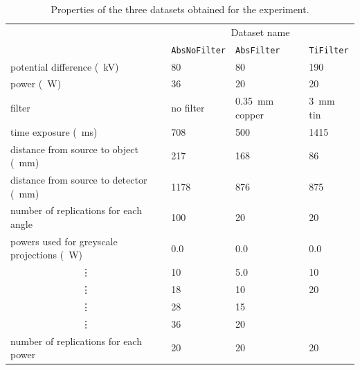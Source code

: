 \begin{table}
\centering
\begin{tabular}{l|lll}
                                                       & \multicolumn{3}{c}{Dataset name}                                                \\
                                                       & \texttt{AbsNoFilter} & \texttt{AbsFilter}             & \texttt{TiFilter}        \\ \hline
potential difference (\SI{}{\kilo\volt})               & 80                   & 80                             & 190                      \\
power (\SI{}{\watt})                                   & 36                   & 20                             & 20                       \\
filter                                                 & no filter            & \SI{0.35}{\milli\metre} copper & \SI{3}{\milli\metre} tin \\
time exposure (\SI{}{\milli\second})                   & 708                  & 500                            & 1415                     \\
distance from source to object (\SI{}{\milli\metre})   & 217                  & 168                            & 86                       \\
distance from source to detector (\SI{}{\milli\metre}) & 1178                 & 876                            & 875                      \\
number of replications for each angle                  & 100                  & 20                             & 20                       \\ \hline
powers used for greyscale projections (\SI{}{\watt})   & 0.0                  & 0.0                            & 0.0                      \\
\multicolumn{1}{c|}{\vdots}                            & 10                   & 5.0                            & 10                       \\
\multicolumn{1}{c|}{\vdots}                            & 18                   & 10                             & 20                       \\
\multicolumn{1}{c|}{\vdots}                            & 28                   & 15                             &                          \\
\multicolumn{1}{c|}{\vdots}                            & 36                   & 20                             &                          \\
number of replications for each power                  & 20                   & 20                             & 20                    
\end{tabular}
\caption{Properties of the three datasets obtained for the experiment.}
\label{table:data_dataset}
\end{table}

